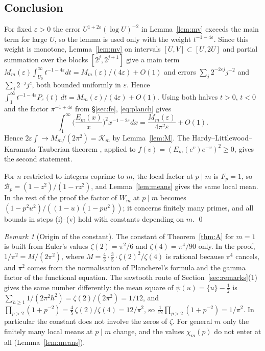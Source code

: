 \documentclass[11pt]{amsart}
\theoremstyle{remark}
\newtheorem{remark}{Remark}
\newcommand{\cB}{\mathcal{B}}
\begin{document}
\subsection{Conclusion}
For fixed $\varepsilon>0$ the error $U^{1+2\varepsilon}(\log U)^{-2}$ in Lemma~\ref{lem:mv} exceeds the main term for large $U$, so the lemma is used only with the weight $t^{-1-4\varepsilon}$. Since this weight is monotone, Lemma~\ref{lem:mv} on intervals $[U,V]\subset[U,2U]$ and partial summation over the blocks $[2^j,2^{j+1}]$ give a main term $M_m(\varepsilon)\int_{U_0}^\infty t^{-1-4\varepsilon}dt=M_m(\varepsilon)/(4\varepsilon)+O(1)$ and errors $\sum_j2^{-2\varepsilon j}j^{-2}$ and $\sum_j2^{-j}j^c$, both bounded uniformly in $\varepsilon$. Hence $\int_1^\infty t^{-1-4\varepsilon}P_\varepsilon(t)\,dt=M_m(\varepsilon)/(4\varepsilon)+O(1)$. Using both halves $t>0$, $t<0$ and the factor $\pi^{-1+4\varepsilon}$ from \S\ref{sec:fe}, \eqref{eq:planch} gives
\[
\int_1^\infty\Big(\frac{E_m(x)}x\Big)^2x^{-1-2\varepsilon}dx=\frac{M_m(\varepsilon)}{4\pi^2\varepsilon}+O(1).
\]
Hence $2\varepsilon\int\to M_m/(2\pi^2)=\mathcal K_m$ by Lemma~\ref{lem:M}. The Hardy--Littlewood--Karamata Tauberian theorem \cite[\S II.7]{Te}, applied to $f(v)=(E_m(e^v)e^{-v})^2\ge0$, gives the second statement.

For $n$ restricted to integers coprime to $m$, the local factor at $p\mid m$ is $F_p=1$, so $\cB_p=(1-z^2)/(1-rz^2)$, and Lemma~\ref{lem:means} gives the same local mean. In the rest of the proof the factor of $W_m$ at $p\mid m$ becomes $(1-p^2u^2)/((1-u)(1-pu^2))$; it concerns finitely many primes, and all bounds in steps (i)--(v) hold with constants depending on $m$. \qed

\begin{remark}[Origin of the constant]
The constant of Theorem~\ref{thm:A} for $m=1$ is built from Euler's values $\zeta(2)=\pi^2/6$ and $\zeta(4)=\pi^4/90$ only. In the proof, $1/\pi^2=M/(2\pi^2)$, where $M=\frac43\cdot\frac35\cdot\zeta(2)^2/\zeta(4)$ is rational because $\pi^4$ cancels, and $\pi^2$ comes from the normalisation of Plancherel's formula and the gamma factor of the functional equation. The sawtooth route of Section~\ref{sec:remarks}(1) gives the same number differently: the mean square of $\psi(u)=\{u\}-\frac12$ is $\sum_{h\ge1}1/(2\pi^2h^2)=\zeta(2)/(2\pi^2)=1/12$, and $\prod_{p>2}(1+p^{-2})=\frac45\,\zeta(2)/\zeta(4)=12/\pi^2$, so $\frac1{12}\prod_{p>2}(1+p^{-2})=1/\pi^2$. In particular the constant does not involve the zeros of $\zeta$.
For general $m$ only the finitely many local means at $p\mid m$ change, and the values $\chi_m(p)$ do not enter at all (Lemma~\ref{lem:means}).
\end{remark}
\end{document}
